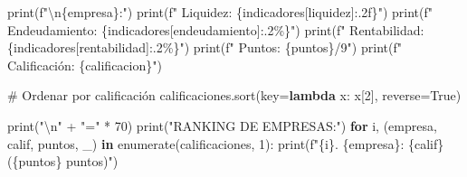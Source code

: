 \documentclass[
  doc,
  floatsintext,
  longtable,
  a4paper,
  nolmodern,
  notxfonts,
  notimes,
  12pt,
  colorlinks=true,linkcolor=blue,citecolor=blue,urlcolor=blue]{apa7}
\newenvironment{Shaded}{\begin{snugshade}}{\end{snugshade}}
\newcommand{\BuiltInTok}[1]{\textcolor[rgb]{0.00,0.23,0.31}{#1}}
\newcommand{\CharTok}[1]{\textcolor[rgb]{0.13,0.47,0.30}{#1}}
\newcommand{\CommentTok}[1]{\textcolor[rgb]{0.37,0.37,0.37}{#1}}
\newcommand{\ControlFlowTok}[1]{\textcolor[rgb]{0.00,0.23,0.31}{\textbf{#1}}}
\newcommand{\DecValTok}[1]{\textcolor[rgb]{0.68,0.00,0.00}{#1}}
\newcommand{\KeywordTok}[1]{\textcolor[rgb]{0.00,0.23,0.31}{\textbf{#1}}}
\newcommand{\NormalTok}[1]{\textcolor[rgb]{0.00,0.23,0.31}{#1}}
\newcommand{\OperatorTok}[1]{\textcolor[rgb]{0.37,0.37,0.37}{#1}}
\newcommand{\SpecialCharTok}[1]{\textcolor[rgb]{0.37,0.37,0.37}{#1}}
\newcommand{\SpecialStringTok}[1]{\textcolor[rgb]{0.13,0.47,0.30}{#1}}
\newcommand{\StringTok}[1]{\textcolor[rgb]{0.13,0.47,0.30}{#1}}
\newcommand{\VariableTok}[1]{\textcolor[rgb]{0.07,0.07,0.07}{#1}}
\begin{document}
\begin{Shaded}
\begin{Highlighting}[]
    \BuiltInTok{print}\NormalTok{(}\SpecialStringTok{f"}\CharTok{\textbackslash{}n}\SpecialCharTok{\{}\NormalTok{empresa}\SpecialCharTok{\}}\SpecialStringTok{:"}\NormalTok{)}
    \BuiltInTok{print}\NormalTok{(}\SpecialStringTok{f"  Liquidez: }\SpecialCharTok{\{}\NormalTok{indicadores[}\StringTok{\textquotesingle{}liquidez\textquotesingle{}}\NormalTok{]}\SpecialCharTok{:.2f\}}\SpecialStringTok{"}\NormalTok{)}
    \BuiltInTok{print}\NormalTok{(}\SpecialStringTok{f"  Endeudamiento: }\SpecialCharTok{\{}\NormalTok{indicadores[}\StringTok{\textquotesingle{}endeudamiento\textquotesingle{}}\NormalTok{]}\SpecialCharTok{:.2\%\}}\SpecialStringTok{"}\NormalTok{)}
    \BuiltInTok{print}\NormalTok{(}\SpecialStringTok{f"  Rentabilidad: }\SpecialCharTok{\{}\NormalTok{indicadores[}\StringTok{\textquotesingle{}rentabilidad\textquotesingle{}}\NormalTok{]}\SpecialCharTok{:.2\%\}}\SpecialStringTok{"}\NormalTok{)}
    \BuiltInTok{print}\NormalTok{(}\SpecialStringTok{f"  Puntos: }\SpecialCharTok{\{}\NormalTok{puntos}\SpecialCharTok{\}}\SpecialStringTok{/9"}\NormalTok{)}
    \BuiltInTok{print}\NormalTok{(}\SpecialStringTok{f"  Calificación: }\SpecialCharTok{\{}\NormalTok{calificacion}\SpecialCharTok{\}}\SpecialStringTok{"}\NormalTok{)}

\CommentTok{\# Ordenar por calificación}
\NormalTok{calificaciones.sort(key}\OperatorTok{=}\KeywordTok{lambda}\NormalTok{ x: x[}\DecValTok{2}\NormalTok{], reverse}\OperatorTok{=}\VariableTok{True}\NormalTok{)}

\BuiltInTok{print}\NormalTok{(}\StringTok{"}\CharTok{\textbackslash{}n}\StringTok{"} \OperatorTok{+} \StringTok{"="} \OperatorTok{*} \DecValTok{70}\NormalTok{)}
\BuiltInTok{print}\NormalTok{(}\StringTok{"RANKING DE EMPRESAS:"}\NormalTok{)}
\ControlFlowTok{for}\NormalTok{ i, (empresa, calif, puntos, \_) }\KeywordTok{in} \BuiltInTok{enumerate}\NormalTok{(calificaciones, }\DecValTok{1}\NormalTok{):}
    \BuiltInTok{print}\NormalTok{(}\SpecialStringTok{f"}\SpecialCharTok{\{}\NormalTok{i}\SpecialCharTok{\}}\SpecialStringTok{. }\SpecialCharTok{\{}\NormalTok{empresa}\SpecialCharTok{\}}\SpecialStringTok{: }\SpecialCharTok{\{}\NormalTok{calif}\SpecialCharTok{\}}\SpecialStringTok{ (}\SpecialCharTok{\{}\NormalTok{puntos}\SpecialCharTok{\}}\SpecialStringTok{ puntos)"}\NormalTok{)}
\end{Highlighting}
\end{Shaded}
\end{document}
